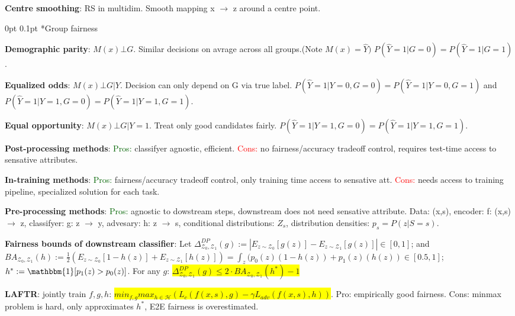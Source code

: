 \documentclass[11pt,landscape,a4paper,fleqn]{article}
\makeatletter
\renewcommand{\subsection}{\@startsection{subsection}{1}{0mm}%
                                {0pt}%
                                {0.1pt}%
                            	{\color{myorange2}\sffamily\small}}
\newcommand{\mhl}[1]{\setlength{\fboxsep}{0pt}\colorbox{yellow}{#1}}
\makeatother
\begin{document}
\begin{multicols*}{4}
\textbf{Centre smoothing}: RS in multidim. Smooth mapping x $\rightarrow$ z around a centre point.

\subsection*{Group fairness}

\textbf{Demographic parity}: $M(x) \bot G$. Similar decisions on avrage across all groups.(Note $M(x) = \hat{Y})$ $P(\hat{Y}=1 | G=0) = P(\hat{Y}=1 | G=1)$.

\textbf{Equalized odds}: $M(x) \bot G|Y$. Decision can only depend on G via true label. $P(\hat{Y}=1 | Y=0, G=0) = P(\hat{Y}=1 | Y=0, G=1)$ and $P(\hat{Y}=1 | Y=1, G=0) = P(\hat{Y}=1 | Y=1, G=1)$.

\textbf{Equal opportunity}: $M(x) \bot G|Y=1$. Treat only good candidates fairly. $P(\hat{Y}=1 | Y=1, G=0) = P(\hat{Y}=1 | Y=1, G=1)$.

\textbf{Post-processing methods}: \textcolor{darkgreen}{Pros:} classifyer agnostic, efficient. \textcolor{red}{Cons:} no fairness/accuracy tradeoff control, requires test-time access to sensative attributes.

\textbf{In-training methods}: \textcolor{darkgreen}{Pros:} fairness/accuracy tradeoff control, only training time access to sensative att. \textcolor{red}{Cons:} needs access to training pipeline, specialized solution for each task.

\textbf{Pre-processing methods}: \textcolor{darkgreen}{Pros:} agnostic to dowstream steps, downstream does not need sensative attribute. Data: (x,s), encoder: f: (x,s) $\rightarrow$ z, classifyer: g: z $\rightarrow$ y, advesary: h: z $\rightarrow$ s, conditional distributions: $Z_s$, distribution densities: $p_s = P(z | S=s)$.

\textbf{Fairness bounds of downstream classifier}: Let $\Delta^{DP}_{\mathcal{Z}_0, \mathcal{Z}_1}(g) := |E_{z\sim \mathcal{Z}_0}[g(z)] - E_{z\sim \mathcal{Z}_1}[g(z)]| \in [0, 1] $; and $BA_{\mathcal{Z}_0, \mathcal{Z}_1}(h) := \frac{1}{2}(E_{z\sim \mathcal{Z}_0}[1-h(z)] + E_{z\sim \mathcal{Z}_1}[h(z)]) = \int_z (p_0(z)(1 - h(z)) + p_1(z)(h(z)) \in [0.5, 1]$; $h^* := \mathbbm{1}[p_1(z) > p_0(z)]$. For any $g$: \colorbox{yellow}{$\Delta^{DP}_{\mathcal{Z}_0, \mathcal{Z}_1}(g) \leq 2 \cdot BA_{\mathcal{Z}_0, \mathcal{Z}_1}(h^*) - 1$}

\textbf{LAFTR}: jointly train $f, g, h$: \mhl{\mbox{\fontsize{9.5}{6}\selectfont$min_{f,g}max_{h \in \mathcal{H}}(L_c(f(x,s), g) - \gamma L_{adv}(f(x,s), h))$}}. Pro: empirically good fairness. Cons: minmax problem is hard, only approximates $h^*$, E2E fairness is overestimated.


\end{multicols*}
\end{document}
